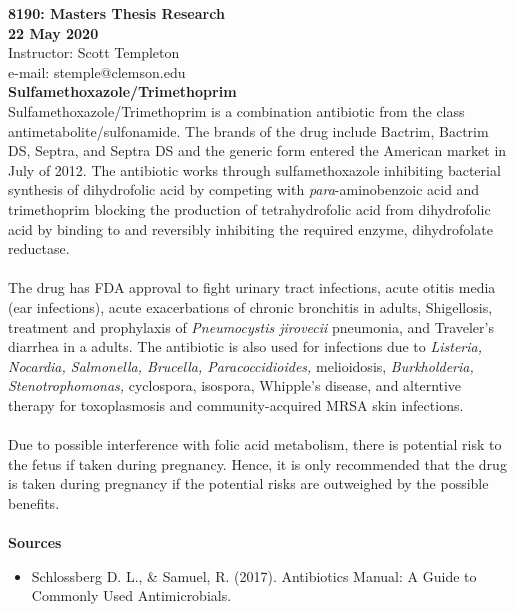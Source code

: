 
\let\counterwithout\relax
\let\counterwithin\relax
{}



\noindent \textbf{8190: Masters Thesis Research}\\
\noindent \textbf{22 May 2020}\\
\noindent Instructor: Scott Templeton \\
e-mail: stemple@clemson.edu\\

\noindent \textbf{Sulfamethoxazole/Trimethoprim}\\
Sulfamethoxazole/Trimethoprim is a combination antibiotic from the class antimetabolite/sulfonamide. The brands of the drug include Bactrim, Bactrim DS, Septra, and Septra DS and the generic form entered the American market in July of 2012. The antibiotic works through sulfamethoxazole inhibiting bacterial synthesis of dihydrofolic acid by competing with \textit{para}-aminobenzoic acid and trimethoprim blocking the production of tetrahydrofolic acid from dihydrofolic acid by binding to and reversibly inhibiting the required enzyme, dihydrofolate reductase.\\
\\
The drug has FDA approval to fight urinary tract infections, acute otitis media (ear infections), acute exacerbations of chronic bronchitis in adults, Shigellosis, treatment and prophylaxis of \textit{Pneumocystis jirovecii} pneumonia, and Traveler's diarrhea in a adults. The antibiotic is also used for infections due to \textit{Listeria, Nocardia, Salmonella, Brucella, Paracoccidioides,} melioidosis, \textit{Burkholderia, Stenotrophomonas,} cyclospora, isospora, Whipple's disease, and alterntive therapy for toxoplasmosis and community-acquired MRSA skin infections.\\
\\
Due to possible interference with folic acid metabolism, there is potential risk to the fetus if taken during pregnancy. Hence, it is only recommended that the drug is taken during pregnancy if the potential risks are outweighed by the possible benefits.\\
\\
\textbf{Sources}
\begin{itemize}
    \item Schlossberg D. L., \& Samuel, R. (2017). Antibiotics Manual: A Guide to Commonly Used Antimicrobials.
\end{itemize}




